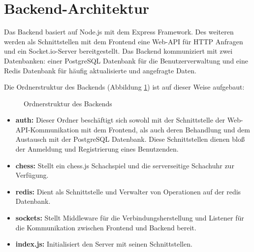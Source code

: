         \section{Backend-Architektur}
Das Backend basiert auf Node.js mit dem Express Framework. Des weiteren werden als Schnittstellen mit dem Frontend eine Web-API für HTTP Anfragen und ein Socket.io-Server bereitgestellt. Das Backend kommuniziert mit zwei Datenbanken: einer PostgreSQL Datenbank für die Benutzerverwaltung und eine Redis Datenbank für häufig aktualisierte und angefragte Daten.

Die Ordnerstruktur des Backends (Abbildung \ref{fig:backend_dirtree}) ist auf dieser Weise aufgebaut:

\begin{figure}[h]
\centering

\begin{minipage}{0.5\textwidth}
\end{minipage}
\caption{Ordnerstruktur des Backends}
\label{fig:backend_dirtree}

\end{figure}

\begin{itemize}
\item \textbf{auth:} Dieser Ordner beschäftigt sich sowohl mit der Schnittstelle der Web-API-Kommunikation mit dem Frontend, als auch deren Behandlung und dem Austausch mit der PostgreSQL Datenbank. Diese Schnittstellen dienen bloß der Anmeldung und Registrierung eines Benutzenden.
\item \textbf{chess:} Stellt ein chess.js Schachspiel und die serverseitige Schachuhr zur Verfügung.
\item \textbf{redis:} Dient als Schnittstelle und Verwalter von Operationen auf der redis Datenbank.
\item \textbf{sockets:} Stellt Middleware für die Verbindungsherstellung und Listener für die Kommunikation zwischen Frontend und Backend bereit.
\item \textbf{index.js:} Initialisiert den Server mit seinen Schnittstellen.
\end{itemize}

